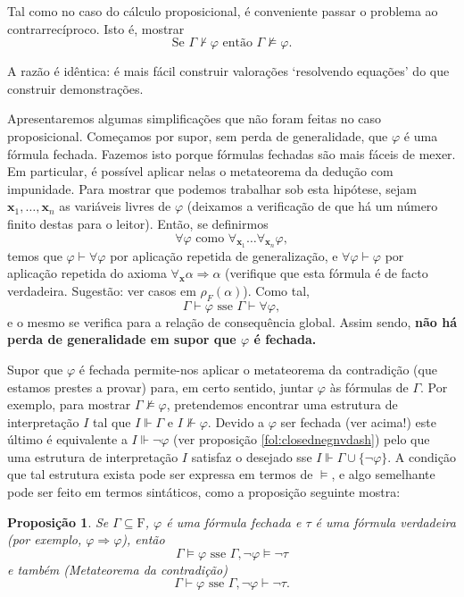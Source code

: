 \documentclass{report}
\newtheorem{prop}{Proposição}
\theoremstyle{definition}
\theoremstyle{remark}
\renewcommand{\bf}[1]{\mathbf{#1}}
\newcommand{\F}{\mathrm{F}}
\newcommand{\imply}{\mathbin{\Rightarrow}}
\begin{document}
	Tal como no caso do cálculo proposicional, é conveniente passar o problema ao contrarrecíproco. Isto é, mostrar
	\[\text{Se } \Gamma \nvdash \varphi \text{ então } \Gamma \nvDash \varphi.\]
	
	A razão é idêntica: é mais fácil construir valorações `resolvendo equações' do que construir demonstrações.
	
	Apresentaremos algumas simplificações que não foram feitas no caso proposicional. Começamos por supor, sem perda de generalidade, que $\varphi$ é uma fórmula fechada. Fazemos isto porque fórmulas fechadas são mais fáceis de mexer. Em particular, é possível aplicar nelas o metateorema da dedução com impunidade. Para mostrar que podemos trabalhar sob esta hipótese, sejam $\bf x_1, \dots, \bf x_n$ as variáveis livres de $\varphi$ (deixamos a verificação de que há um número finito destas para o leitor). Então, se definirmos
	\[\forall \varphi \text{ como } \forall_{\bf x_1} \dots \forall_{\bf x_n} \varphi,\]
	temos que $\varphi \vdash \forall \varphi$ por aplicação repetida de generalização, e $\forall \varphi \vdash \varphi$ por aplicação repetida do axioma $\forall_{\bf x} \alpha \imply \alpha$ (verifique que esta fórmula é de facto verdadeira. Sugestão: ver casos em $\rho_F(\alpha)$). Como tal,
	\[\Gamma \vdash \varphi \text{ sse } \Gamma \vdash \forall \varphi,\]
	e o mesmo se verifica para a relação de consequência global. Assim sendo, \textbf{não há perda de generalidade em supor que $\varphi$ é fechada.}
	
	Supor que $\varphi$ é fechada permite-nos aplicar o metateorema da contradição (que estamos prestes a provar) para, em certo sentido, juntar $\varphi$ às fórmulas de $\Gamma$. Por exemplo, para mostrar $\Gamma \nvDash \varphi$, pretendemos encontrar uma estrutura de interpretação $I$ tal que $I \Vdash \Gamma$ e $I \nVdash \varphi$. Devido a $\varphi$ ser fechada (ver acima!) este último é equivalente a $I \Vdash \neg \varphi$ (ver proposição \ref{fol:closednegnvdash}) pelo que uma estrutura de interpretação $I$ satisfaz o desejado sse $I \Vdash \Gamma \cup \{\neg \varphi\}$. A condição que tal estrutura exista pode ser expressa em termos de $\vDash$, e algo semelhante pode ser feito em termos sintáticos, como a proposição seguinte mostra:
	
	\begin{prop}
	Se $\Gamma \subseteq \F$, $\varphi$ é uma fórmula fechada e $\tau$ é uma fórmula verdadeira (por exemplo, $\varphi \imply \varphi$), então
	\[\Gamma \vDash \varphi \text{ sse } \Gamma, \neg \varphi \vDash \neg \tau\]
	e também (Metateorema da contradição)
	\[\Gamma \vdash \varphi \text{ sse } \Gamma, \neg \varphi \vdash \neg \tau.\]
	\end{prop}
	
\end{document}
